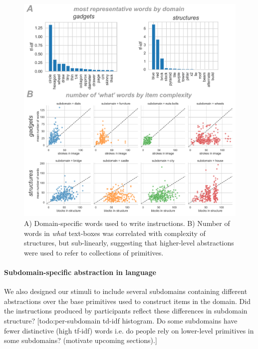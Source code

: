 \documentclass[10pt,letterpaper]{article}
\begin{document}
\begin{figure}
  \begin{center}
  \includegraphics[width=0.98\linewidth]{figures/words_domain_subdomain.pdf}
  \caption{A) Domain-specific words used to write instructions. B) Number of words in \textit{what} text-boxes was correlated with complexity of structures, but sub-linearly, suggesting that higher-level abstractions were used to refer to collections of primitives.}
  \label{fig:words_results}
  \end{center}
  \end{figure}

\paragraph{Subdomain-specific abstraction in language}
We also designed our stimuli to include several subdomains containing different abstractions over the base primitives used to construct items in the domain.
Did the instructions produced by participants reflect these differences in subdomain structure?
[todo:per-subdomain td-idf histogram. Do some subdomains have fewer distinctive (high tf-idf) words i.e. do people rely on lower-level primitives in some subdomains? (motivate upcoming sections).]
\end{document}
